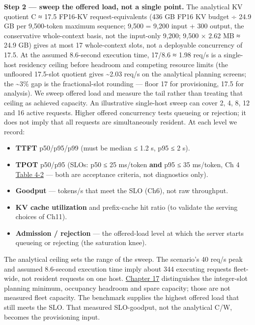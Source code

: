 \textbf{Step 2 --- sweep the offered load, not a single point.} The
analytical KV quotient C ≈ 17.5 FP16-KV request-equivalents (436 GB FP16
KV budget ÷ 24.9 GB per 9,500-token maximum sequence; 9,500 = 9,200
input + 300 output, the conservative whole-context basis, not the
input-only 9,200; 9,500 × 2.62 MB ≈ 24.9 GB) gives at most 17
whole-context slots, not a deployable concurrency of 17.5. At the
assumed 8.6-second execution time, 17/8.6 ≈ 1.98 req/s is a single-host
residency ceiling before headroom and competing resource limits (the
unfloored 17.5-slot quotient gives \textasciitilde2.03 req/s on the
analytical planning screens; the \textasciitilde3\% gap is the
fractional-slot rounding --- floor 17 for provisioning, 17.5 for
analysis). We sweep offered load and measure the tail rather than
treating that ceiling as achieved capacity. An illustrative single-host
sweep can cover 2, 4, 8, 12 and 16 active requests. Higher offered
concurrency tests queueing or rejection; it does not imply that all
requests are simultaneously resident. At each level we record:

\begin{itemize}
\tightlist
\item
  \textbf{TTFT} p50/p95/p99 (must be median ≤ 1.2 s, p95 ≤ 2 s).
\item
  \textbf{TPOT} p50/p95 (SLOs: p50 ≤ 25 ms/token \textbf{and} p95 ≤ 35
  ms/token, Ch 4 \hyperref[tab:4.2]{Table 4-2} --- both are acceptance criteria, not
  diagnostics only).
\item
  \textbf{Goodput} --- tokens/s that meet the SLO (Ch6), not raw
  throughput.
\item
  \textbf{KV cache utilization} and prefix-cache hit ratio (to validate
  the serving choices of Ch11).
\item
  \textbf{Admission / rejection} --- the offered-load level at which the
  server starts queueing or rejecting (the saturation knee).
\end{itemize}

The analytical ceiling sets the range of the sweep. The scenario's 40
req/s peak and assumed 8.6-second execution time imply about 344
executing requests fleet-wide, not resident requests on one host.
\hyperref[chap:17]{Chapter 17} distinguishes the integer-slot planning minimum, occupancy
headroom and spare capacity; those are not measured fleet capacity. The
benchmark supplies the highest offered load that still meets the SLO.
That measured SLO-goodput, not the analytical C/W, becomes the
provisioning input.

